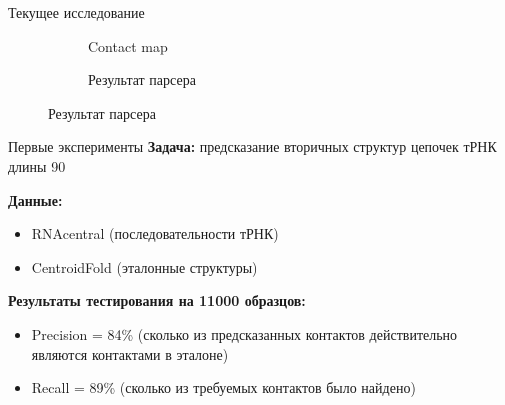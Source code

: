 \documentclass{beamer}
\begin{document}
\begin{frame}{Текущее исследование}
{\begin{figure}
\begin{subfigure}{.3\textwidth}
  \caption{Contact map}
\end{subfigure}
\begin{subfigure}{.3\textwidth}
  \centering
  \caption{Результат парсера}
\end{subfigure}%
\end{figure}
}
\end{frame}

\begin{frame}{Первые эксперименты}
\textbf{Задача:} предсказание вторичных структур цепочек тРНК длины 90

\vspace{6mm}
\textbf{Данные:}
\begin{itemize}
    \item RNAcentral (последовательности тРНК)
    \item CentroidFold (эталонные структуры)
\end{itemize}

\vspace{6mm}

\textbf{Результаты тестирования на 11000 образцов:}
\begin{itemize}
    \item Precision = 84\% (сколько из предсказанных контактов действительно являются контактами в эталоне)
    \item Recall = 89\% (сколько из требуемых контактов было найдено)
\end{itemize}

\end{frame}
\end{document}
